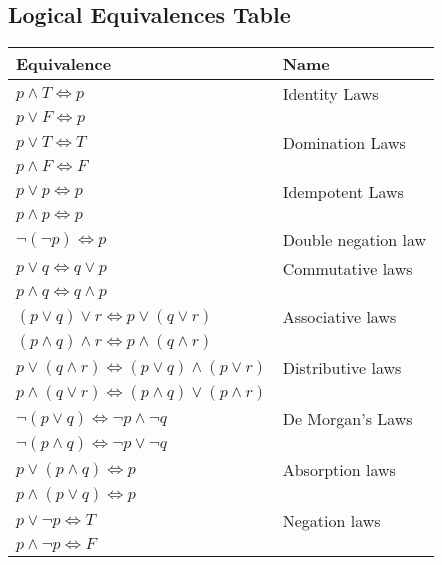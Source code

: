 \documentclass{article}
\begin{document}
\subsection*{Logical Equivalences Table}
\begin{center}
	\begin{tabular}{|l | l|}
		\hline
		Equivalence                                                          & Name                \\
		\hline
		$p \wedge T \Leftrightarrow p$                                       & Identity Laws       \\
		$p \vee F \Leftrightarrow p$                                         &                     \\
		\hline
		$p \vee T \Leftrightarrow T$                                         & Domination Laws     \\
		$p \wedge F \Leftrightarrow F$                                       &                     \\
		\hline
		$p \vee p \Leftrightarrow p$                                         & Idempotent Laws     \\
		$p \wedge p \Leftrightarrow p$                                       &                     \\
		\hline
		$\neg (\neg p) \Leftrightarrow p$                                    & Double negation law \\
		\hline
		$p \vee q \Leftrightarrow q \vee p$                                  & Commutative laws    \\
		$p \wedge q \Leftrightarrow q \wedge p$                              &                     \\
		\hline
		$(p \vee q) \vee r \Leftrightarrow p \vee (q \vee r)$                & Associative laws    \\
		$(p \wedge q) \wedge r \Leftrightarrow p \wedge (q \wedge r)$        &                     \\
		\hline
		$p \vee (q \wedge r) \Leftrightarrow (p \vee q) \wedge (p \vee r)$   & Distributive laws   \\
		$p \wedge (q \vee r) \Leftrightarrow (p \wedge q) \vee (p \wedge r)$ &                     \\
		\hline
		$\neg (p \vee q) \Leftrightarrow \neg p \wedge \neg q$               & De Morgan's Laws    \\
		$\neg (p \wedge q) \Leftrightarrow \neg p \vee \neg q$               &                     \\
		\hline
		$p \vee (p \wedge q) \Leftrightarrow p$                              & Absorption laws     \\
		$p \wedge (p \vee q) \Leftrightarrow p$                              &                     \\
		\hline
		$p \vee \neg p \Leftrightarrow T$                                    & Negation laws       \\
		$p \wedge \neg p \Leftrightarrow F$                                  &                     \\
		\hline
	\end{tabular}

\end{center}
\end{document}
